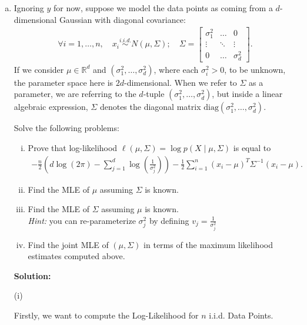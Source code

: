 \documentclass{article}
\newenvironment{solution}{\color{blue} \smallskip \textbf{Solution:}}{}
\begin{document}
\begin{enumerate}[(a)]
    \item %
    Ignoring $y$ for now, suppose we model the data points as coming from a $d$-dimensional Gaussian with diagonal covariance:
    \begin{align*}
       \forall i = 1, \ldots, n, \quad x_i \stackrel{i.i.d.}{\sim} N(\mu, \Sigma); \quad  \Sigma = \begin{bmatrix} \sigma_1^2 & \ldots & 0 \\ 
        \vdots & \ddots & \vdots \\ 0 & \ldots & \sigma_d^2\end{bmatrix}.
    \end{align*}
    If we consider $\mu\in\mathbb R^d$ and $(\sigma_1^2,\ldots, \sigma_d^2)$, where each $\sigma_i^2 > 0$, to be unknown, the parameter space here is $2d$-dimensional. When we refer to $\Sigma$ as a parameter, we are referring to the $d$-tuple $(\sigma_1^2,\ldots, \sigma_d^2)$, but inside a linear algebraic expression, $\Sigma$ denotes the diagonal matrix $\mathrm{diag}(\sigma_1^2,\ldots,\sigma_d^2)$.

    Solve the following problems:
    \begin{enumerate}[(i)]
        \item Prove that log-likelihood $\ell(\mu, \Sigma) = \log p(X \mid \mu, \Sigma)$ is equal to
        \begin{align*}
            -\frac{n}{2}\left(d \log (2\pi) - \sum_{j = 1}^{d} \log\left(\frac{1}{\sigma_{j}^{2}}\right)\right) - \frac{1}{2} \sum_{i = 1}^{n}(x_{i} - \mu)^{T}\Sigma^{-1}(x_{i} - \mu).
        \end{align*}

        \item Find the MLE of $\mu$ assuming $\Sigma$ is known.
        \item Find the MLE of $\Sigma$ assuming $\mu$ is known. \\
        \textit{Hint:} you can re-parameterize $\sigma_j^2$ by defining $v_j=\frac{1}{\sigma_j^2}$
        \item Find the joint MLE of $(\mu, \Sigma)$ in terms of the maximum likelihood estimates computed above.
    \end{enumerate}
    
    \begin{solution}
    
(i) 

Firstly, we want to compute the Log-Likelihood for \(n\) i.i.d. Data Points.


\end{solution}
\end{enumerate}
\end{document}
